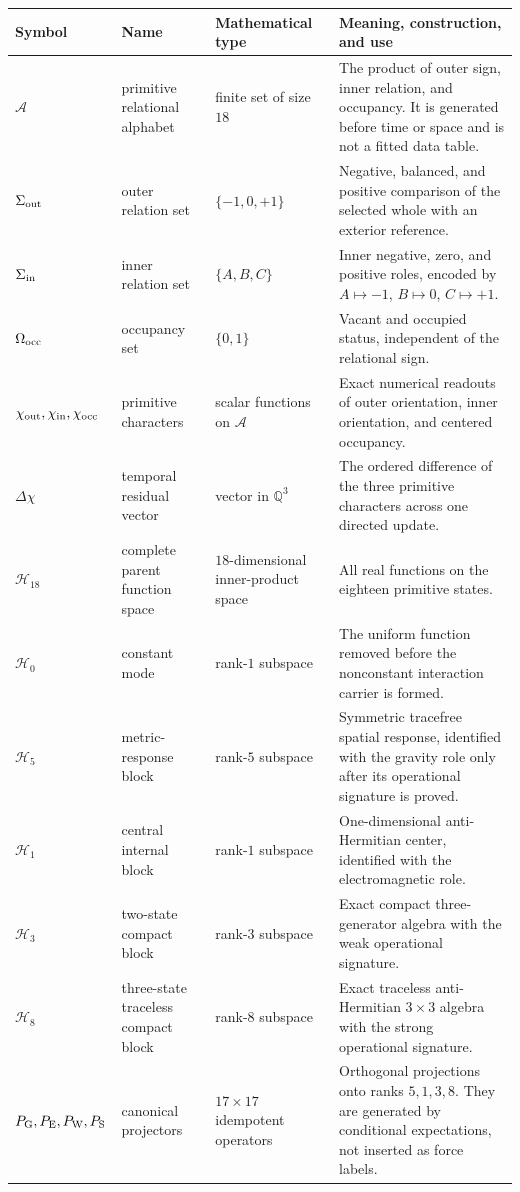\documentclass[11pt]{article}
\numberwithin{equation}{section}
\theoremstyle{remark}
\newcommand{\Q}{\mathbb{Q}}
\begin{document}
\begin{longtable}{p{2.1cm}p{3.1cm}p{3.2cm}p{5.6cm}}
\toprule
Symbol & Name & Mathematical type & Meaning, construction, and use\\
\midrule\endhead
$\mathcal A$ & primitive relational alphabet & finite set of size $18$ & The product of outer sign, inner relation, and occupancy. It is generated before time or space and is not a fitted data table.\\
$\Sigma_{\rm out}$ & outer relation set & $\{-1,0,+1\}$ & Negative, balanced, and positive comparison of the selected whole with an exterior reference.\\
$\Sigma_{\rm in}$ & inner relation set & $\{A,B,C\}$ & Inner negative, zero, and positive roles, encoded by $A\mapsto-1$, $B\mapsto0$, $C\mapsto+1$.\\
$\Omega_{\rm occ}$ & occupancy set & $\{0,1\}$ & Vacant and occupied status, independent of the relational sign.\\
$\chi_{\rm out},\chi_{\rm in},\chi_{\rm occ}$ & primitive characters & scalar functions on $\mathcal A$ & Exact numerical readouts of outer orientation, inner orientation, and centered occupancy.\\
$\Delta\chi$ & temporal residual vector & vector in $\Q^3$ & The ordered difference of the three primitive characters across one directed update.\\
$\mathcal H_{18}$ & complete parent function space & $18$-dimensional inner-product space & All real functions on the eighteen primitive states.\\
$\mathcal H_0$ & constant mode & rank-$1$ subspace & The uniform function removed before the nonconstant interaction carrier is formed.\\
$\mathcal H_5$ & metric-response block & rank-$5$ subspace & Symmetric tracefree spatial response, identified with the gravity role only after its operational signature is proved.\\
$\mathcal H_1$ & central internal block & rank-$1$ subspace & One-dimensional anti-Hermitian center, identified with the electromagnetic role.\\
$\mathcal H_3$ & two-state compact block & rank-$3$ subspace & Exact compact three-generator algebra with the weak operational signature.\\
$\mathcal H_8$ & three-state traceless compact block & rank-$8$ subspace & Exact traceless anti-Hermitian $3\times3$ algebra with the strong operational signature.\\
$P_{\rm G},P_{\rm E},P_{\rm W},P_{\rm S}$ & canonical projectors & $17\times17$ idempotent operators & Orthogonal projections onto ranks $5,1,3,8$. They are generated by conditional expectations, not inserted as force labels.\\

\end{longtable}
\end{document}

